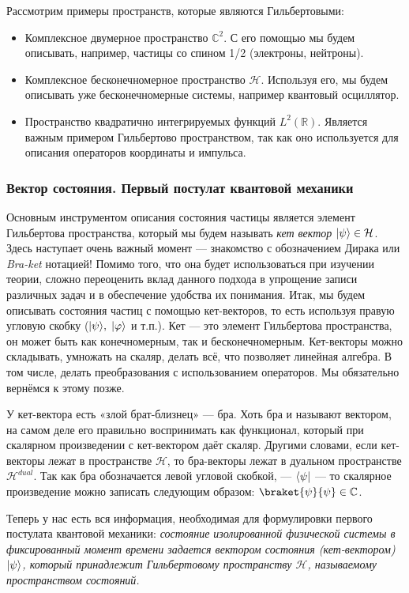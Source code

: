 Рассмотрим примеры пространств, которые являются Гильбертовыми:
\begin{itemize}
  \item Комплексное двумерное пространство $\mathbb{C}^2$. С его помощью мы будем
        описывать, например, частицы со спином 1/2 (электроны, нейтроны).
  \item Комплексное бесконечномерное пространство $\mathcal{H}$. Используя его, мы
        будем описывать уже бесконечномерные системы, например квантовый осциллятор.
  \item Пространство квадратично интегрируемых функций $L^2(\mathbb{R})$. Является
        важным примером Гильбертово пространством, так как оно используется для
        описания операторов координаты и импульса.
\end{itemize}

\subsubsection{Вектор состояния. Первый постулат квантовой механики}
Основным инструментом описания состояния частицы является элемент Гильбертова
пространства, который мы будем называть \textit{кет вектор} $\lvert\psi\rangle \in
  \mathcal{H}$. Здесь наступает очень важный момент --- знакомство с обозначением
Дирака или \textit{Bra-ket} нотацией! Помимо того, что она будет использоваться
при изучении теории, сложно переоценить вклад данного подхода в упрощение
записи различных задач и в обеспечение удобства их понимания. Итак, мы будем
описывать состояния частиц с помощью кет-векторов, то есть используя правую
угловую скобку ($\lvert\psi\rangle, \; \lvert\varphi\rangle$ и т.п.). Кет --- это элемент
Гильбертова пространства, он может быть как конечномерным, так и
бесконечномерным. Кет-векторы можно складывать, умножать на скаляр, делать всё,
что позволяет линейная алгебра. В том числе, делать преобразования с
использованием операторов. Мы обязательно вернёмся к этому позже.

У кет-вектора есть «злой брат-близнец» --- бра. Хоть бра и называют вектором,
на самом деле его правильно воспринимать как функционал, который при скалярном
произведении с кет-вектором даёт скаляр. Другими словами, если кет-векторы
лежат в пространстве $\mathcal{H}$, то бра-векторы лежат в дуальном
пространстве $\mathcal{H}^{dual}$. Так как бра обозначается левой угловой
скобкой, --- $\langle\psi\rvert$ --- то скалярное произведение можно записать
следующим образом: $\braket{\psi}{\psi} \in \mathbb{C}$.

Теперь у нас есть вся информация, необходимая для формулировки первого
постулата квантовой механики: \textit{состояние изолированной физической
  системы в фиксированный момент времени задается вектором состояния
  (кет-вектором) $\lvert\psi\rangle$, который принадлежит Гильбертовому пространству
  $\mathcal{H}$, называемому пространством состояний.}

